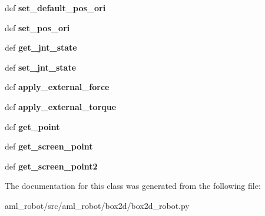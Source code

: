 \begin{DoxyCompactItemize}
\item 
\hypertarget{classaml__robot_1_1box2d_1_1box2d__robot_1_1_box2_d_robot_a25a6b9985cd11c6ae6fd9383604c4b0b}{def {\bfseries set\-\_\-default\-\_\-pos\-\_\-ori}}\label{classaml__robot_1_1box2d_1_1box2d__robot_1_1_box2_d_robot_a25a6b9985cd11c6ae6fd9383604c4b0b}

\item 
\hypertarget{classaml__robot_1_1box2d_1_1box2d__robot_1_1_box2_d_robot_a4d74d3af55846c87a1820c594bb68215}{def {\bfseries set\-\_\-pos\-\_\-ori}}\label{classaml__robot_1_1box2d_1_1box2d__robot_1_1_box2_d_robot_a4d74d3af55846c87a1820c594bb68215}

\item 
\hypertarget{classaml__robot_1_1box2d_1_1box2d__robot_1_1_box2_d_robot_a405f01e5de8fc96b445ac99032061a83}{def {\bfseries get\-\_\-jnt\-\_\-state}}\label{classaml__robot_1_1box2d_1_1box2d__robot_1_1_box2_d_robot_a405f01e5de8fc96b445ac99032061a83}

\item 
\hypertarget{classaml__robot_1_1box2d_1_1box2d__robot_1_1_box2_d_robot_a1c28c9e032c9b49a8cb81c58f6c128ec}{def {\bfseries set\-\_\-jnt\-\_\-state}}\label{classaml__robot_1_1box2d_1_1box2d__robot_1_1_box2_d_robot_a1c28c9e032c9b49a8cb81c58f6c128ec}

\item 
\hypertarget{classaml__robot_1_1box2d_1_1box2d__robot_1_1_box2_d_robot_af0385046609d300390b4cbb078157eb4}{def {\bfseries apply\-\_\-external\-\_\-force}}\label{classaml__robot_1_1box2d_1_1box2d__robot_1_1_box2_d_robot_af0385046609d300390b4cbb078157eb4}

\item 
\hypertarget{classaml__robot_1_1box2d_1_1box2d__robot_1_1_box2_d_robot_aa708d15fd4399fd47f8944b697edab79}{def {\bfseries apply\-\_\-external\-\_\-torque}}\label{classaml__robot_1_1box2d_1_1box2d__robot_1_1_box2_d_robot_aa708d15fd4399fd47f8944b697edab79}

\item 
\hypertarget{classaml__robot_1_1box2d_1_1box2d__robot_1_1_box2_d_robot_a6c95ab953ee201bdca26cda8e27f8433}{def {\bfseries get\-\_\-point}}\label{classaml__robot_1_1box2d_1_1box2d__robot_1_1_box2_d_robot_a6c95ab953ee201bdca26cda8e27f8433}

\item 
\hypertarget{classaml__robot_1_1box2d_1_1box2d__robot_1_1_box2_d_robot_aa391c13d62150d149d082048ca996d59}{def {\bfseries get\-\_\-screen\-\_\-point}}\label{classaml__robot_1_1box2d_1_1box2d__robot_1_1_box2_d_robot_aa391c13d62150d149d082048ca996d59}

\item 
\hypertarget{classaml__robot_1_1box2d_1_1box2d__robot_1_1_box2_d_robot_a94cecd232db91a546c5afc2ea808f2cf}{def {\bfseries get\-\_\-screen\-\_\-point2}}\label{classaml__robot_1_1box2d_1_1box2d__robot_1_1_box2_d_robot_a94cecd232db91a546c5afc2ea808f2cf}

\end{DoxyCompactItemize}


The documentation for this class was generated from the following file\-:\begin{DoxyCompactItemize}
\item 
aml\-\_\-robot/src/aml\-\_\-robot/box2d/box2d\-\_\-robot.\-py\end{DoxyCompactItemize}
